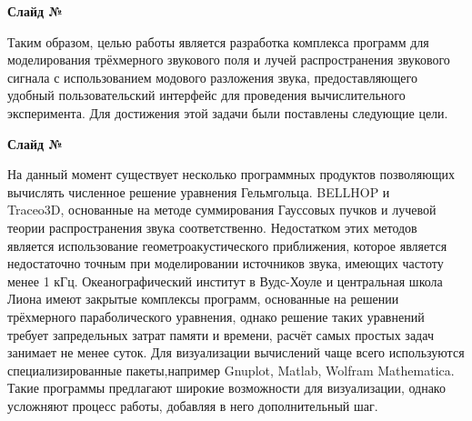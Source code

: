 \documentclass{fefu}
\newcounter{slide}
\newcommand{\slide}{\vskip 1cm\par {\bf Слайд №\theslide}\par\stepcounter{slide}}
\begin{document}
    \slide Таким образом, целью работы является разработка комплекса программ для моделирования трёхмерного звукового поля и лучей распространения звукового сигнала с использованием модового разложения звука, предоставляющего удобный пользовательский интерфейс для проведения вычислительного эксперимента. Для достижения этой задачи были поставлены следующие цели.
    \slide На данный момент существует несколько программных продуктов позволяющих вычислять численное решение уравнения Гельмгольца. BELLHOP и \\Traceo3D, основанные на методе суммирования Гауссовых пучков и лучевой теории распространения звука соответственно. Недостатком этих методов является использование геометроакустического приближения, которое является недостаточно точным при моделировании источников звука, имеющих частоту менее 1 кГц. Океанографический институт в Вудс-Хоуле и центральная школа Лиона имеют закрытые комплексы программ, основанные на решении трёхмерного параболического уравнения, однако решение таких уравнений требует запредельных затрат памяти и времени, расчёт самых простых задач занимает не менее суток. Для визуализации вычислений чаще всего используются специализированные пакеты,например Gnuplot, Matlab, Wolfram Mathematica. Такие программы предлагают широкие возможности для визуализации, однако усложняют процесс работы, добавляя в него дополнительный шаг.
\end{document}
